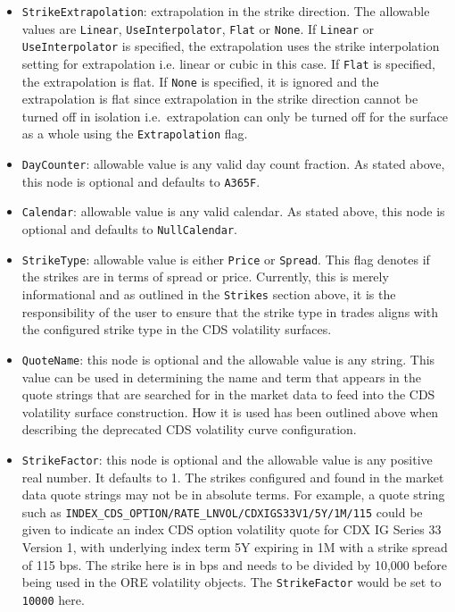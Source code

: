 \begin{itemize}
\item
\lstinline!StrikeExtrapolation!: extrapolation in the strike direction. The allowable values are \lstinline!Linear!, \lstinline!UseInterpolator!, \lstinline!Flat! or \lstinline!None!. If \lstinline!Linear! or \lstinline!UseInterpolator! is specified, the extrapolation uses the strike interpolation setting for extrapolation i.e. linear or cubic in this case. If \lstinline!Flat! is specified, the extrapolation is flat. If \lstinline!None! is specified, it is ignored and the extrapolation is flat since extrapolation in the strike direction cannot be turned off in isolation i.e.\ extrapolation can only be turned off for the surface as a whole using the \lstinline!Extrapolation! flag.

\item
\lstinline!DayCounter!: allowable value is any valid day count fraction. As stated above, this node is optional and defaults to \lstinline!A365F!.

\item
\lstinline!Calendar!: allowable value is any valid calendar. As stated above, this node is optional and defaults to \lstinline!NullCalendar!.

\item
\lstinline!StrikeType!: allowable value is either \lstinline!Price! or \lstinline!Spread!. This flag denotes if the strikes are in terms of spread or price. Currently, this is merely informational and as outlined in the \lstinline!Strikes! section above, it is the responsibility of the user to ensure that the strike type in trades aligns with the configured strike type in the CDS volatility surfaces.

\item
\lstinline!QuoteName!: this node is optional and the allowable value is any string. This value can be used in determining the name and term that appears in the quote strings that are searched for in the market data to feed into the CDS volatility surface construction. How it is used has been outlined above when describing the deprecated CDS volatility curve configuration.

\item
\lstinline!StrikeFactor!: this node is optional and the allowable value is any positive real number. It defaults to 1. The strikes configured and found in the market data quote strings may not be in absolute terms. For example, a quote string such as \lstinline!INDEX_CDS_OPTION/RATE_LNVOL/CDXIGS33V1/5Y/1M/115! could be given to indicate an index CDS option volatility quote for CDX IG Series 33 Version 1, with underlying index term 5Y expiring in 1M with a strike spread of 115 bps. The strike here is in bps and needs to be divided by 10,000 before being used in the ORE volatility objects. The \lstinline!StrikeFactor! would be set to \lstinline!10000! here.


\end{itemize}

